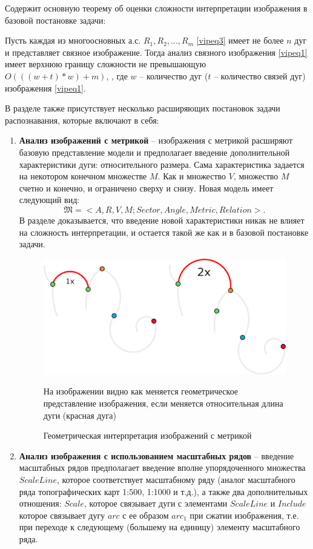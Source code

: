 Содержит основную теорему об оценки сложности интерпретации изображения в базовой постановке задачи:

\begin{theorem}
Пусть каждая из многоосновных а.с. $R_1, R_2, ..., R_m$  \ref{vipeq3} имеет не  более   $n$   дуг и представляет связное изображение. Тогда анализ  связного изображения \ref{vipeq1} имеет верхнюю границу сложности не превышающую $O(((w + t)*w) + m)$,  , где  $w$ -- количество дуг ($t$ -- количество связей дуг) изображения \ref{vipeq1}.
\label{main_theorem_1}
\end{theorem}

В разделе также присутствует несколько расширяющих постановок задачи распознавания, которые включают в себя:

\begin{enumerate}
\item \textbf{Анализ изображений с метрикой} -- изображения с метрикой расширяют базовую представление модели и предполагает введение дополнительной характеристики дуги: относительного размера. Сама характеристика задается на некотором конечном множестве $M$. Как и множество $V$, множество $M$ счетно и конечно, и ограничено сверху и снизу. Новая модель имеет следующий вид: $$\mathfrak{M}=<A, R, V, M; Sector, Angle, Metric, Relation>.$$ В разделе доказывается, что введение новой характеристики никак не влияет на сложность интерпретации, и остается такой же как и в базовой постановке задачи. 

\begin{figure}[h]
\centering
\includegraphics[width=0.85\linewidth,keepaspectratio]{images/metrics}
\caption{Геометрическая интерпретация изображений с метрикой}
\medskip
\small
На изображении видно как меняется геометрическое представление изображения, если меняется относительная длина дуги (красная дуга)
\end{figure}

\item \textbf{Анализ изображения с использованием масштабных рядов} -- введение масштабных рядов предполагает введение вполне упорядоченного множества $ScaleLine$, которое соответствует масштабному ряду (аналог масштабного ряда топографических карт 1:500,  1:1000 и т.д.), а также два дополнительных отношения: $Scale$,  которое связывает дуги с элементами $ScaleLine$ и $Include$ которое связывает дугу $arc$ с ее образом $arc_1$ при сжатии изображения, т.е. при переходе к следующему (большему на единицу) элементу масштабного ряда.


\end{enumerate}
